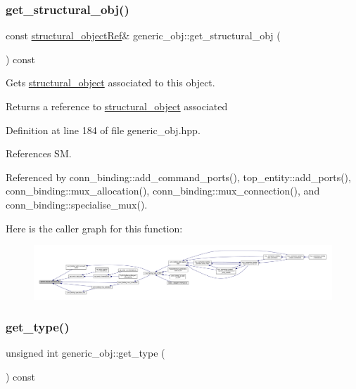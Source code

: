 \subsubsection{\texorpdfstring{get\+\_\+structural\+\_\+obj()}{get\_structural\_obj()}}
{\footnotesize\ttfamily const \hyperlink{structural__objects_8hpp_a8ea5f8cc50ab8f4c31e2751074ff60b2}{structural\+\_\+object\+Ref}\& generic\+\_\+obj\+::get\+\_\+structural\+\_\+obj (\begin{DoxyParamCaption}{ }\end{DoxyParamCaption}) const\hspace{0.3cm}{\ttfamily [inline]}}



Gets \hyperlink{classstructural__object}{structural\+\_\+object} associated to this object. 

\begin{DoxyReturn}{Returns}
a reference to \hyperlink{classstructural__object}{structural\+\_\+object} associated 
\end{DoxyReturn}


Definition at line 184 of file generic\+\_\+obj.\+hpp.



References SM.



Referenced by conn\+\_\+binding\+::add\+\_\+command\+\_\+ports(), top\+\_\+entity\+::add\+\_\+ports(), conn\+\_\+binding\+::mux\+\_\+allocation(), conn\+\_\+binding\+::mux\+\_\+connection(), and conn\+\_\+binding\+::specialise\+\_\+mux().

Here is the caller graph for this function\+:
\nopagebreak
\begin{figure}[H]
\begin{center}
\leavevmode
\includegraphics[width=350pt]{d1/d64/classgeneric__obj_a1de67b6b028dd7548f5ce367779cec25_icgraph}
\end{center}
\end{figure}
\mbox{\label{classgeneric__obj_abbd8f729a1c6ab9b2e842f4d75c81422}} 
\subsubsection{\texorpdfstring{get\+\_\+type()}{get\_type()}}
{\footnotesize\ttfamily unsigned int generic\+\_\+obj\+::get\+\_\+type (\begin{DoxyParamCaption}{ }\end{DoxyParamCaption}) const\hspace{0.3cm}{\ttfamily [inline]}}




